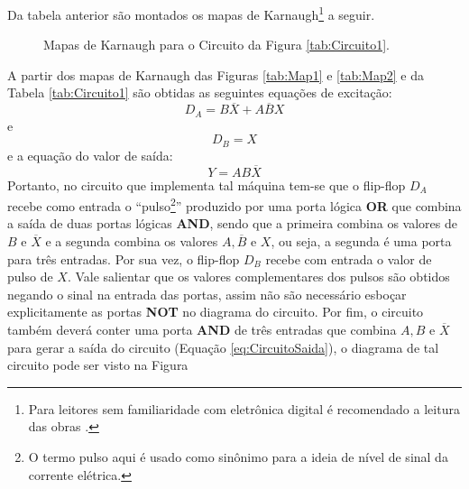 \begin{example}
	Da tabela anterior são montados os mapas de Karnaugh\footnote{Para leitores sem familiaridade com eletrônica digital é recomendado a leitura das obras \cite{hold2002, idoeta2018, lourenco1996}.} \cite{hold2002, idoeta2018, lourenco1996}a seguir.
	
	\begin{figure}[h]
		\centering
		\caption{Mapas de Karnaugh para o Circuito da Figura \ref{tab:Circuito1}.}
		\label{fig:Mapa}
	\end{figure}

	A partir dos mapas de Karnaugh das Figuras \ref{tab:Map1} e \ref{tab:Map2} e da Tabela \ref{tab:Circuito1} são obtidas as seguintes equações de excitação:
	\begin{equation}\label{eq:Excitacao1}
		D_A = B\overline{X} + A\overline{B}X
	\end{equation}
	e
	\begin{equation}\label{eq:Excitacao2}
		D_B = X
	\end{equation}
	e a equação do valor de saída:
	\begin{equation}\label{eq:CircuitoSaida}
		Y = AB\overline{X}
	\end{equation}
	Portanto, no circuito que implementa tal máquina tem-se que o flip-flop $D_A$ recebe como entrada o ``pulso\footnote{O termo pulso aqui é usado como sinônimo para a ideia de nível de sinal da corrente elétrica.}'' produzido por uma porta lógica \textbf{OR} que combina a saída de duas portas lógicas \textbf{AND}, sendo que a primeira combina os valores de  $B$ e $\overline{X}$ e a segunda combina os valores $A, \overline{B}$ e $X$, ou seja, a segunda é uma porta para três entradas. Por sua vez, o flip-flop $D_B$ recebe com entrada o valor de pulso de $X$.  Vale salientar que os valores complementares dos pulsos são obtidos negando o sinal na entrada das portas, assim não são necessário esboçar explicitamente as portas \textbf{NOT} no diagrama do circuito. Por fim, o circuito também deverá conter uma porta \textbf{AND} de três entradas que combina $A,B$ e $\overline{X}$ para gerar a saída do circuito (Equação \ref{eq:CircuitoSaida}), o diagrama de tal circuito pode ser visto na Figura 



\end{example}
